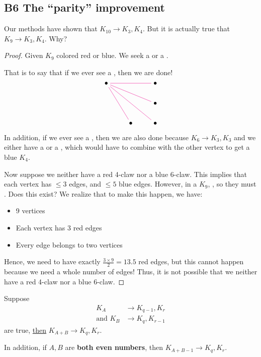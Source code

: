 \documentclass[12pt]{article}
\begin{document}
\subsection{B6 The ``parity'' improvement}
Our methods have shown that $K_{10}\to K_3,K_4$. But it is actually true that $K_{9}\to K_3,K_4$. Why?
\begin{proof}
    Given $K_9$ colored red or blue. We seek a  or a . 
    
    That is to say that if we ever see a , then we are done!
    \[\begin{tikzcd}[ampersand replacement=\&,cramped]
        \bullet \&\& \bullet \\
        \&\& \bullet \\
        \& \bullet \& \bullet
        \arrow[color=magenta, no head, from=1-1, to=1-3]
        \arrow[color=magenta, no head, from=1-1, to=3-3]
        \arrow[color=magenta, no head, from=1-1, to=2-3]
        \arrow[color=magenta, no head, from=1-1, to=3-2]
    \end{tikzcd}\]

    In addition, if we ever see a , then we are also done because $K_6\to K_3,K_3$ and we either have a  or a , which would have to combine with the other vertex to get a blue $K_4$.

    Now suppose we neither have a red 4-claw nor a blue 6-claw. This implies that each vertex has $\leq 3$  edges, and $\leq 5$ blue edges. However, in a $K_9$, , so they must . Does this exist? We realize that to make this happen, we have:\begin{itemize}
        \item 9 vertices
        \item Each vertex has 3 red edges
        \item Every edge belongs to two vertices
    \end{itemize}
    Hence, we need to have exactly $\frac{3\times9}{2}=13.5$ red edges, but this cannot happen because we need a whole number of edges! Thus, it is not possible that we neither have a red 4-claw nor a blue 6-claw.
\end{proof}

\begin{lemma}
    Suppose \begin{align*}
        K_A&\to K_{q-1},K_r\\
        \text{and }K_B&\to K_q, K_{r-1}
    \end{align*}
    are true, \uline{then} $K_{A+B}\to K_q,K_r$.

    In addition, if $A,B$ are \textbf{both even numbers}, then $K_{A+B-1}\to K_q,K_r$.
\end{lemma}
\end{document}
